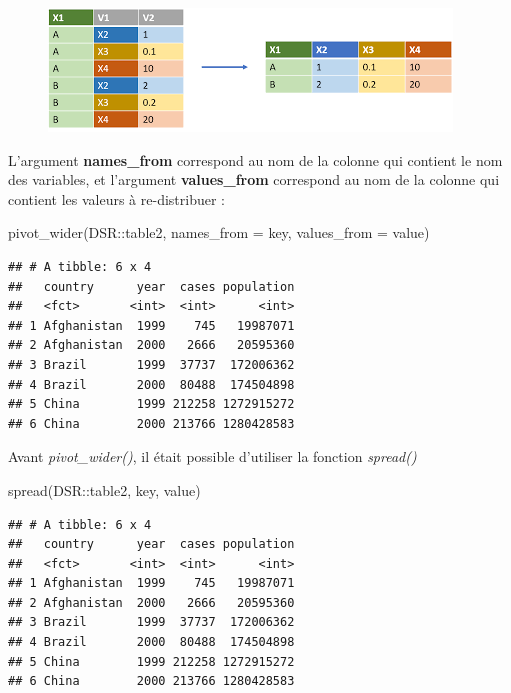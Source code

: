 \documentclass[
]{book}
\newenvironment{Shaded}{\begin{snugshade}}{\end{snugshade}}
\newcommand{\AttributeTok}[1]{\textcolor[rgb]{0.77,0.63,0.00}{#1}}
\newcommand{\FunctionTok}[1]{\textcolor[rgb]{0.00,0.00,0.00}{#1}}
\newcommand{\NormalTok}[1]{#1}
\newcommand{\SpecialCharTok}[1]{\textcolor[rgb]{0.00,0.00,0.00}{#1}}
\theoremstyle{definition}
\theoremstyle{definition}
\theoremstyle{definition}
\theoremstyle{definition}
\theoremstyle{remark}
\begin{document}
\begin{figure}
\includegraphics[width=0.8\linewidth,height=\textheight]{Figures/pivot_wider} \end{figure}

L'argument \textbf{names\_from} correspond au nom de la colonne qui contient le nom des variables, et l'argument \textbf{values\_from} correspond au nom de la colonne qui contient les valeurs à re-distribuer :

\begin{Shaded}
\begin{Highlighting}[]
\FunctionTok{pivot\_wider}\NormalTok{(DSR}\SpecialCharTok{::}\NormalTok{table2, }\AttributeTok{names\_from =}\NormalTok{ key, }
            \AttributeTok{values\_from =}\NormalTok{ value)}
\end{Highlighting}
\end{Shaded}

\begin{verbatim}
## # A tibble: 6 x 4
##   country      year  cases population
##   <fct>       <int>  <int>      <int>
## 1 Afghanistan  1999    745   19987071
## 2 Afghanistan  2000   2666   20595360
## 3 Brazil       1999  37737  172006362
## 4 Brazil       2000  80488  174504898
## 5 China        1999 212258 1272915272
## 6 China        2000 213766 1280428583
\end{verbatim}

Avant \emph{pivot\_wider()}, il était possible d'utiliser la fonction \emph{spread()}

\begin{Shaded}
\begin{Highlighting}[]
\FunctionTok{spread}\NormalTok{(DSR}\SpecialCharTok{::}\NormalTok{table2, key, value)}
\end{Highlighting}
\end{Shaded}

\begin{verbatim}
## # A tibble: 6 x 4
##   country      year  cases population
##   <fct>       <int>  <int>      <int>
## 1 Afghanistan  1999    745   19987071
## 2 Afghanistan  2000   2666   20595360
## 3 Brazil       1999  37737  172006362
## 4 Brazil       2000  80488  174504898
## 5 China        1999 212258 1272915272
## 6 China        2000 213766 1280428583
\end{verbatim}
\end{document}
